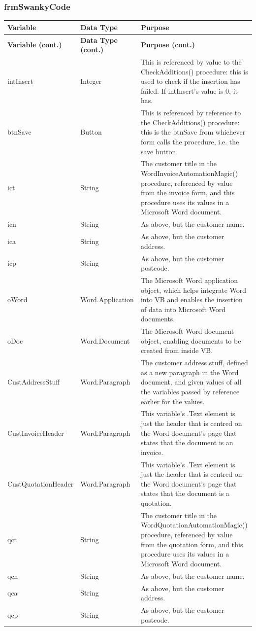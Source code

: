 	\subsubsection{frmSwankyCode}
	\begin{longtable}{ | p{4cm} | p{3cm} | p{10cm} |}
		\hline
		\textbf{Variable} & \textbf{Data Type} & \textbf{Purpose}\\
		\endfirsthead
		\hline
		\textbf{Variable (cont.)} & \textbf{Data Type (cont.)} & \textbf{Purpose (cont.)}\\
		\endhead
		\hline
		intInsert & Integer & This is referenced by value to the CheckAdditions() procedure: this is used to check if the insertion has failed.  If intInsert's value is 0, it has.\\
		\hline
		btnSave & Button & This is referenced by reference to the CheckAdditions() procedure: this is the btnSave from whichever form calls the procedure, i.e. the save button.\\
		\hline
		ict & String & The customer title in the WordInvoiceAutomationMagic() procedure, referenced by value from the invoice form, and this procedure uses its values in a Microsoft Word document.\\
		\hline
		icn & String & As above, but the customer name.\\
		\hline
		ica & String & As above, but the customer address.\\
		\hline
		icp & String & As above, but the customer postcode.\\
		\hline
		oWord & Word.Application & The Microsoft Word application object, which helps integrate Word into VB and enables the insertion of data into Microsoft Word documents.\\
		\hline
		oDoc & Word.Document & The Microsoft Word document object, enabling documents to be created from inside VB.\\
		\hline
		CustAddressStuff & Word.Paragraph & The customer address stuff, defined as a new paragraph in the Word document, and given values of all the variables passed by reference earlier for the values.\\
		\hline
		CustInvoiceHeader & Word.Paragraph & This variable's .Text element is just the header that is centred on the Word document's page that states that the document is an invoice.\\
		\hline
		CustQuotationHeader & Word.Paragraph & This variable's .Text element is just the header that is centred on the Word document's page that states that the document is a quotation.\\
		\hline
		qct & String & The customer title in the WordQuotationAutomationMagic() procedure, referenced by value from the quotation form, and this procedure uses its values in a Microsoft Word document.\\
		\hline
		qcn & String & As above, but the customer name.\\
		\hline
		qca & String & As above, but the customer address.\\
		\hline
		qcp & String & As above, but the customer postcode.\\
		\hline
	\end{longtable}
	
